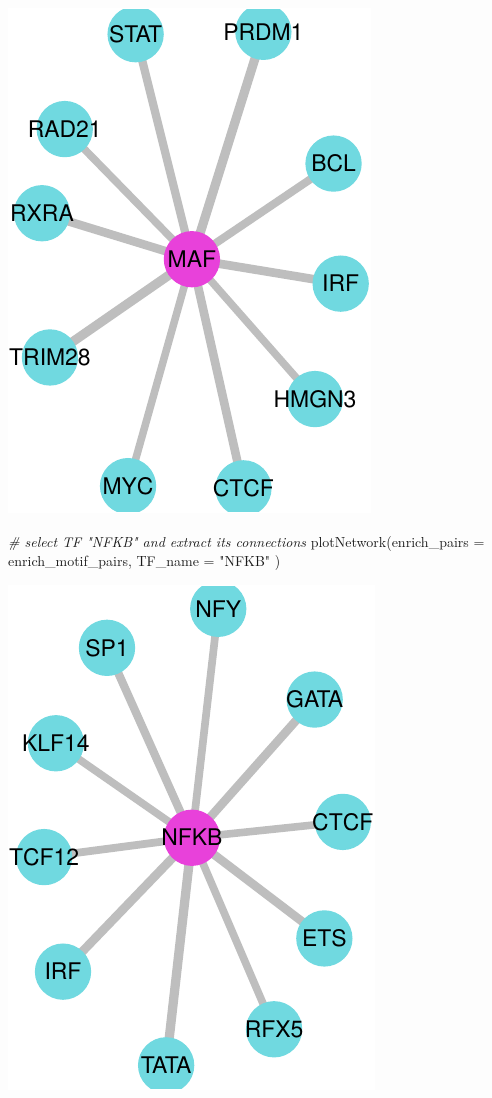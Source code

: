 \documentclass[
]{article}
\newenvironment{Shaded}{}{}
\newcommand{\AttributeTok}[1]{\textcolor[rgb]{0.49,0.56,0.16}{#1}}
\newcommand{\CommentTok}[1]{\textcolor[rgb]{0.38,0.63,0.69}{\textit{#1}}}
\newcommand{\FunctionTok}[1]{\textcolor[rgb]{0.02,0.16,0.49}{#1}}
\newcommand{\NormalTok}[1]{#1}
\newcommand{\StringTok}[1]{\textcolor[rgb]{0.25,0.44,0.63}{#1}}
\begin{document}
\includegraphics{enrichmotifpairR_user_manual_guide_files/figure-latex/CD8_H3K27ac_vs_H3K27me3_6-2.pdf}

\begin{Shaded}
\begin{Highlighting}[]

\CommentTok{\# select TF "NFKB" and extract its connections}
\FunctionTok{plotNetwork}\NormalTok{(}\AttributeTok{enrich\_pairs =}\NormalTok{ enrich\_motif\_pairs, }
            \AttributeTok{TF\_name =} \StringTok{"NFKB"}
\NormalTok{            )}
\end{Highlighting}
\end{Shaded}

\includegraphics{enrichmotifpairR_user_manual_guide_files/figure-latex/CD8_H3K27ac_vs_H3K27me3_6-3.pdf}
\end{document}
